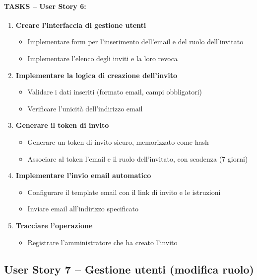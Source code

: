 \paragraph*{TASKS – User Story 6:}
\begin{enumerate}
    \item \textbf{Creare l'interfaccia di gestione utenti}
    \begin{itemize}
        \item Implementare form per l'inserimento dell'email e del ruolo dell'invitato
        \item Implementare l'elenco degli inviti e la loro revoca
    \end{itemize}
    \item \textbf{Implementare la logica di creazione dell'invito}
    \begin{itemize}
        \item Validare i dati inseriti (formato email, campi obbligatori)
        \item Verificare l'unicità dell'indirizzo email
    \end{itemize}
    \item \textbf{Generare il token di invito}
    \begin{itemize}
        \item Generare un token di invito sicuro, memorizzato come hash
        \item Associare al token l'email e il ruolo dell'invitato, con scadenza (7 giorni)
    \end{itemize}
    \item \textbf{Implementare l'invio email automatico}
    \begin{itemize}
        \item Configurare il template email con il link di invito e le istruzioni
        \item Inviare email all'indirizzo specificato
    \end{itemize}
    \item \textbf{Tracciare l'operazione}
    \begin{itemize}
        \item Registrare l'amministratore che ha creato l'invito
    \end{itemize}
\end{enumerate}


\subsection{User Story 7 – Gestione utenti (modifica ruolo)}
\label{us:modificaPermessi}

